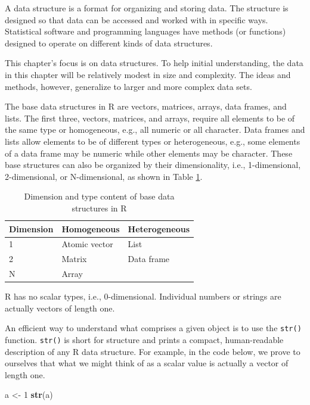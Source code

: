 \documentclass[
]{krantz}
\newenvironment{Shaded}{\begin{snugshade}}{\end{snugshade}}
\newcommand{\DecValTok}[1]{\textcolor[rgb]{0.00,0.00,0.81}{#1}}
\newcommand{\KeywordTok}[1]{\textcolor[rgb]{0.13,0.29,0.53}{\textbf{#1}}}
\newcommand{\NormalTok}[1]{#1}
\newcommand{\StringTok}[1]{\textcolor[rgb]{0.31,0.60,0.02}{#1}}
\begin{document}
A data structure is a format for organizing and storing data. The structure is designed so that data can be accessed and worked with in specific ways. Statistical software and programming languages have methods (or functions) designed to operate on different kinds of data structures.

This chapter's focus is on data structures. To help initial understanding, the data in this chapter will be relatively modest in size and complexity. The ideas and methods, however, generalize to larger and more complex data sets.

The base data structures in R are vectors, matrices, arrays, data frames, and lists. The first three, vectors, matrices, and arrays, require all elements to be of the same type or homogeneous, e.g., all numeric or all character. Data frames and lists allow elements to be of different types or heterogeneous, e.g., some elements of a data frame may be numeric while other elements may be character. These base structures can also be organized by their dimensionality, i.e., 1-dimensional, 2-dimensional, or N-dimensional, as shown in Table \ref{tab:dataStructures}.

\begin{table}

\caption{\label{tab:dataStructures}Dimension and type content of base data structures
  in R}
\centering
\begin{tabular}[t]{lll}
\toprule
Dimension & Homogeneous & Heterogeneous\\
\midrule
1 & Atomic vector & List\\
2 & Matrix & Data frame\\
N & Array & \\
\bottomrule
\end{tabular}
\end{table}

R has no scalar types, i.e., 0-dimensional. Individual numbers or strings are actually vectors of length one.

An efficient way to understand what comprises a given object is to use the \texttt{str()} function. \texttt{str()} is short for structure and prints a compact, human-readable description of any R data structure. For example, in the code below, we prove to ourselves that what we might think of as a scalar value is actually a vector of length one.

\begin{Shaded}
\begin{Highlighting}[]
\NormalTok{a \textless{}{-}}\StringTok{ }\DecValTok{1}
\KeywordTok{str}\NormalTok{(a)}
\end{Highlighting}
\end{Shaded}
\end{document}
